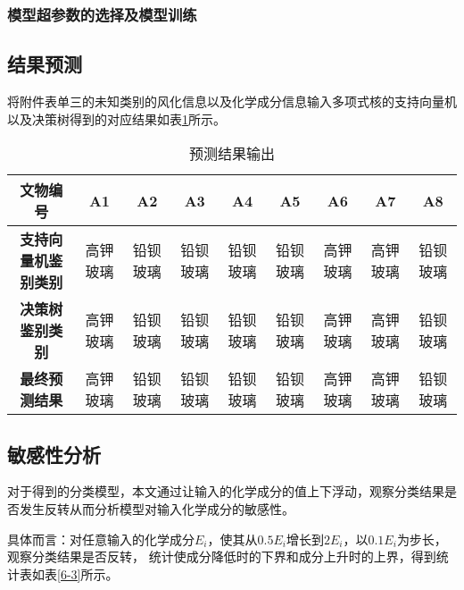 \documentclass[withoutpreface,bwprint]{cumcmthesis} %
\begin{document}
\subsubsection{模型超参数的选择及模型训练}

\subsection{结果预测}

将附件表单三的未知类别的风化信息以及化学成分信息输入多项式核的支持向量机以及决策树得到的对应结果如表\ref{6-2}所示。


\begin{table}[!h]
	\centering
	\small 
	\caption{预测结果输出}
	\label{6-2}
	\begin{tabular}{@{}ccccccccc@{}}
		\toprule
		\textbf{文物编号}      & \textbf{A1} & \textbf{A2} & \textbf{A3} & \textbf{A4} & \textbf{A5} & \textbf{A6} & \textbf{A7} & \textbf{A8} \\ \midrule
		\textbf{支持向量机鉴别类别} & 高钾玻璃        & 铅钡玻璃        & 铅钡玻璃        & 铅钡玻璃        & 铅钡玻璃        & 高钾玻璃        & 高钾玻璃        & 铅钡玻璃        \\
		\textbf{决策树鉴别类别}   & 高钾玻璃        & 铅钡玻璃        & 铅钡玻璃        & 铅钡玻璃        & 铅钡玻璃        & 高钾玻璃        & 高钾玻璃        & 铅钡玻璃        \\
		\textbf{最终预测结果}    & 高钾玻璃        & 铅钡玻璃        & 铅钡玻璃        & 铅钡玻璃        & 铅钡玻璃        & 高钾玻璃        & 高钾玻璃        & 铅钡玻璃        \\ \bottomrule
	\end{tabular}
\end{table}


\subsection{敏感性分析}

对于得到的分类模型，本文通过让输入的化学成分的值上下浮动，观察分类结果是否发生反转从而分析模型对输入化学成分的敏感性。


具体而言：对任意输入的化学成分$E_i$，使其从$0.5E_i$增长到$2E_i$，以$0.1E_i$为步长，观察分类结果是否反转， 统计使成分降低时的下界和成分上升时的上界，得到统计表如表\ref{6-3}所示。
\end{document}
